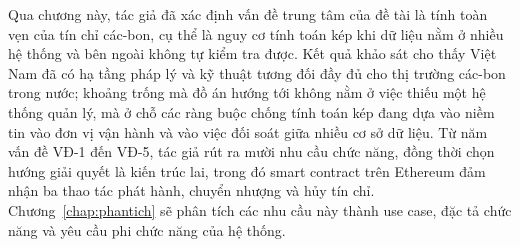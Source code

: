 Qua chương này, tác giả đã xác định vấn đề trung tâm của đề tài là tính toàn vẹn của tín chỉ các-bon, cụ thể là nguy cơ tính toán kép khi dữ liệu nằm ở nhiều hệ thống và bên ngoài không tự kiểm tra được. Kết quả khảo sát cho thấy Việt Nam đã có hạ tầng pháp lý và kỹ thuật tương đối đầy đủ cho thị trường các-bon trong nước; khoảng trống mà đồ án hướng tới không nằm ở việc thiếu một hệ thống quản lý, mà ở chỗ các ràng buộc chống tính toán kép đang dựa vào niềm tin vào đơn vị vận hành và vào việc đối soát giữa nhiều cơ sở dữ liệu. Từ năm vấn đề VĐ-1 đến VĐ-5, tác giả rút ra mười nhu cầu chức năng, đồng thời chọn hướng giải quyết là kiến trúc lai, trong đó smart contract trên Ethereum đảm nhận ba thao tác phát hành, chuyển nhượng và hủy tín chỉ. Chương~\ref{chap:phantich} sẽ phân tích các nhu cầu này thành use case, đặc tả chức năng và yêu cầu phi chức năng của hệ thống.
